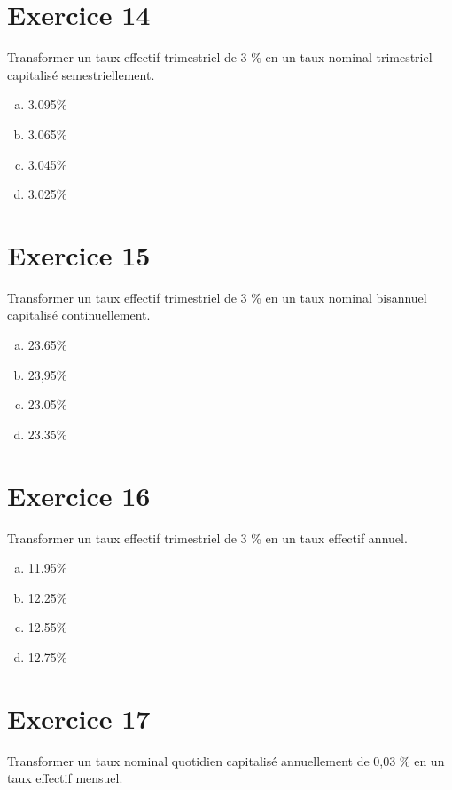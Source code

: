 \documentclass[10pt,a4paper]{article}
\begin{document}
\section*{Exercice 14}
Transformer un taux effectif trimestriel de 3 \% en un taux nominal trimestriel capitalisé semestriellement.



\begin{enumerate}[a)]
\item 3.095\%
\item 3.065\%
\item 3.045\%
\item 3.025\%
\end{enumerate}



\section*{Exercice 15}
Transformer un taux effectif trimestriel de 3 \% en un taux nominal bisannuel capitalisé continuellement.



\begin{enumerate}[a)]
\item 23.65\%
\item 23,95\%
\item 23.05\%
\item 23.35\%
\end{enumerate}


\section*{Exercice 16}
Transformer un taux effectif trimestriel de 3 \% en un taux effectif annuel.



\begin{enumerate}[a)]
\item 11.95\%
\item 12.25\%
\item 12.55\%
\item 12.75\%
\end{enumerate}


\section*{Exercice 17}
Transformer un taux nominal quotidien capitalisé annuellement de 0,03 \% en un taux effectif mensuel.
\end{document}
